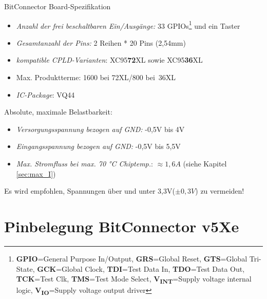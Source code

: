\documentclass{article}
\begin{document}
BitConnector Board-Spezifikation
\begin{itemize}
	\item \textit{Anzahl der frei beschaltbaren Ein/Ausgänge:} \hspace{0.3cm} 33 GPIOs\footnote{\textbf{GPIO}=General Purpose In/Output, \textbf{GRS}=Global Reset, \textbf{GTS}=Global Tri-State, \textbf{GCK}=Global Clock, \textbf{TDI}=Test Data In, \textbf{TDO}=Test Data Out, \textbf{TCK}=Test Clk, \textbf{TMS}=Test Mode Select, \textbf{V\textsubscript{INT}}=Supply voltage internal logic, \textbf{V\textsubscript{IO}}=Supply voltage output driver} und ein Taster
	\item \textit{Gesamtanzahl der Pins:} \hspace{3.6cm} 2 Reihen * 20 Pins (2,54mm)
	\item \textit{kompatible CPLD-Varianten}: \hspace{2.8cm} XC95\textbf{72}XL sowie XC95\textbf{36}XL
	\item Max. Produktterme: \hspace{4.1cm} 1600 bei 72XL/800 bei~36XL
	\item \textit{IC-Package}: \hspace{5.3cm} VQ44 
\end{itemize}

Absolute, maximale Belastbarkeit:
\begin{itemize}
	\item \textit{Versorgungsspannung bezogen auf GND:} \hspace{1cm} -0,5V bis 4V
	\item \textit{Eingangsspannung bezogen auf GND:} \hspace{1.45cm} -0,5V bis 5,5V
	\item \textit{Max. Stromfluss bei max. 70 \si{\celsius} Chiptemp.}:\hspace{0.6cm} $\approx1,6A$ (siehe Kapitel \ref{sec:max_I})
\end{itemize}

Es wird empfohlen, Spannungen über und unter 3,3V($\pm 0,3V$) zu vermeiden!

\section{Pinbelegung BitConnector v5Xe}
\label{sec:Pins}
\end{document}
